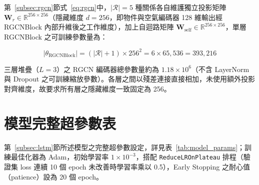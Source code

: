 第~\ref{subsec:rgcn}節式~\eqref{eq:rgcn}中，$|\mathcal{R}|=5$ 種關係各自維護獨立投影矩陣 $\mathbf{W}_r \in \mathbb{R}^{256 \times 256}$（隱藏維度 $d=256$，即物件與空氣編碼器 128 維輸出經 RGCNBlock 內部升維後之工作維度），加上自迴路矩陣 $\mathbf{W}_{\text{self}} \in \mathbb{R}^{256\times256}$，單層 RGCNBlock 之可訓練參數量為：

\begin{equation}
    |\theta_{\text{RGCNBlock}}| = (|\mathcal{R}| + 1) \times 256^2 = 6 \times 65{,}536 = 393{,}216
    \label{eq:rgcn_params_appx}
\end{equation}

三層堆疊（$L=3$）之 RGCN 編碼器總參數量約為 $1.18 \times 10^6$（不含 LayerNorm 與 Dropout 之可訓練縮放參數）。各層之間以殘差連接直接相加，未使用額外投影對齊維度，故要求所有層之隱藏維度一致固定為 256。


\section{模型完整超參數表}
\label{appx:model_hparams}

第~\ref{subsec:lstm}節所述模型之完整超參數設定，詳見表~\ref{tab:model_params}；訓練最佳化器為 Adam，初始學習率 $1\times10^{-3}$，搭配 \texttt{ReduceLROnPlateau} 排程（驗證集 loss 連續 10 個 epoch 未改善時學習率乘以 0.5），Early Stopping 之耐心值（patience）設為 20 個 epoch。

